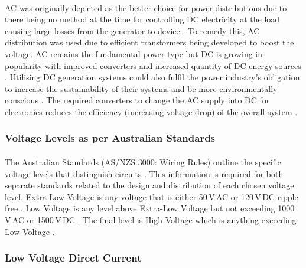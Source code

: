 \paragraph{}
AC was originally depicted as the better choice for power distributions due to there being no method at the time for controlling DC electricity at the load causing large losses from the generator to device \cite{Starke2008b}. To remedy this, AC distribution was used due to efficient transformers being developed to boost the voltage. AC remains the fundamental power type but DC is growing in popularity with improved converters and increased quantity of DC energy sources \cite{Starke2008b}. Utilising DC generation systems could also fulfil the power industry's obligation to increase the sustainability of their systems and be more environmentally conscious \cite{Starke2008a}. The required converters to change the AC supply into DC for electronics reduces the efficiency (increasing voltage drop) of the overall system \cite{Starke2008b}.    

\subsubsection{Voltage Levels as per Australian Standards}

\paragraph{}
The Australian Standards (AS/NZS 3000: Wiring Rules) outline the specific voltage levels that distinguish circuits \cite{StandardsAustralia2007}. This information is required for both separate standards related to the design and distribution of each chosen voltage level. Extra-Low Voltage is any voltage that is either 50\,V\,AC or 120\,V\,DC ripple free \cite{StandardsAustralia2007}. Low Voltage is any level above Extra-Low Voltage but not exceeding 1000\,V\,AC or 1500\,V\,DC \cite{StandardsAustralia2007}. The final level is High Voltage which is anything exceeding Low-Voltage \cite{StandardsAustralia2007}.  


\subsubsection{Low Voltage Direct Current}

